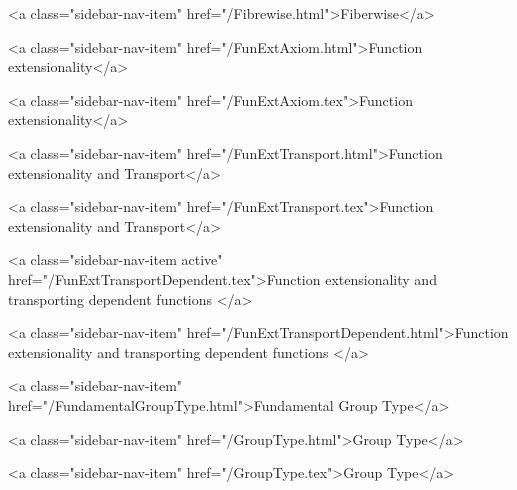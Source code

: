       
    
      
        
          <a class="sidebar-nav-item" href="/Fibrewise.html">Fiberwise</a>
        
      
    
      
        
          <a class="sidebar-nav-item" href="/FunExtAxiom.html">Function extensionality</a>
        
      
    
      
        
          <a class="sidebar-nav-item" href="/FunExtAxiom.tex">Function extensionality</a>
        
      
    
      
        
          <a class="sidebar-nav-item" href="/FunExtTransport.html">Function extensionality and Transport</a>
        
      
    
      
        
          <a class="sidebar-nav-item" href="/FunExtTransport.tex">Function extensionality and Transport</a>
        
      
    
      
        
          <a class="sidebar-nav-item active" href="/FunExtTransportDependent.tex">Function extensionality and transporting dependent functions </a>
        
      
    
      
        
          <a class="sidebar-nav-item" href="/FunExtTransportDependent.html">Function extensionality and transporting dependent functions </a>
        
      
    
      
        
          <a class="sidebar-nav-item" href="/FundamentalGroupType.html">Fundamental Group Type</a>
        
      
    
      
        
          <a class="sidebar-nav-item" href="/GroupType.html">Group Type</a>
        
      
    
      
        
          <a class="sidebar-nav-item" href="/GroupType.tex">Group Type</a>
        
      
    
